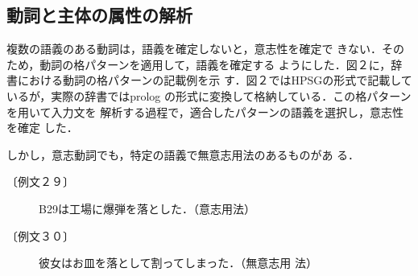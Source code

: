\subsection{動詞と主体の属性の解析}
複数の語義のある動詞は，語義を確定しないと，意志性を確定で
きない．そのため，動詞の格パターンを適用して，語義を確定する
ようにした．図２に，辞書における動詞の格パターンの記載例を示
す．図２ではHPSGの形式で記載しているが，実際の辞書ではprolog
の形式に変換して格納している．この格パターンを用いて入力文を
解析する過程で，適合したパターンの語義を選択し，意志性を確定
した．

しかし，意志動詞でも，特定の語義で無意志用法のあるものがあ
る．
\begin{description}
\item[〔例文２９〕] B29は工場に爆弾を落とした．（意志用法）
\item[〔例文３０〕] 彼女はお皿を落として割ってしまった．（無意志用
法）
\end{description}

